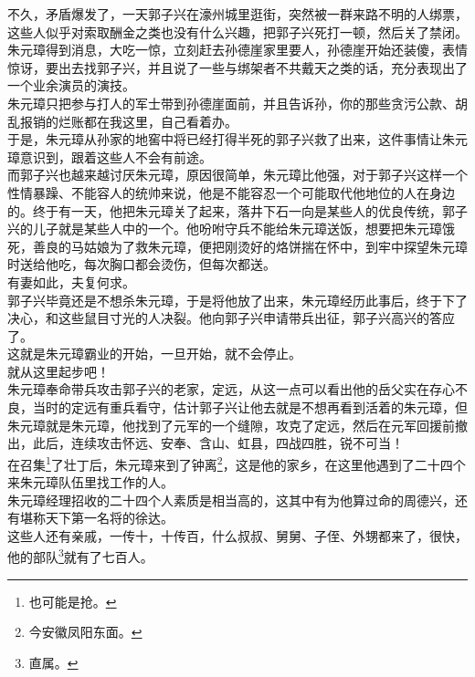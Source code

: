 \begin{multicols}{\theparacolNo}
不久，矛盾爆发了，一天郭子兴在濠州城里逛街，突然被一群来路不明的人绑票，这些人似乎对索取酬金之类也没有什么兴趣，把郭子兴死打一顿，然后关了禁闭。朱元璋得到消息，大吃一惊，立刻赶去孙德崖家里要人，孙德崖开始还装傻，表情惊讶，要出去找郭子兴，并且说了一些与绑架者不共戴天之类的话，充分表现出了一个业余演员的演技。\\

朱元璋只把参与打人的军士带到孙德崖面前，并且告诉孙，你的那些贪污公款、胡乱报销的烂账都在我这里，自己看着办。\\

于是，朱元璋从孙家的地窖中将已经打得半死的郭子兴救了出来，这件事情让朱元璋意识到，跟着这些人不会有前途。\\

而郭子兴也越来越讨厌朱元璋，原因很简单，朱元璋比他强，对于郭子兴这样一个性情暴躁、不能容人的统帅来说，他是不能容忍一个可能取代他地位的人在身边的。终于有一天，他把朱元璋关了起来，落井下石一向是某些人的优良传统，郭子兴的儿子就是某些人中的一个。他吩咐守兵不能给朱元璋送饭，想要把朱元璋饿死，善良的马姑娘为了救朱元璋，便把刚烫好的烙饼揣在怀中，到牢中探望朱元璋时送给他吃，每次胸口都会烫伤，但每次都送。\\

有妻如此，夫复何求。\\

郭子兴毕竟还是不想杀朱元璋，于是将他放了出来，朱元璋经历此事后，终于下了决心，和这些鼠目寸光的人决裂。他向郭子兴申请带兵出征，郭子兴高兴的答应了。\\

这就是朱元璋霸业的开始，一旦开始，就不会停止。\\

就从这里起步吧！\\

朱元璋奉命带兵攻击郭子兴的老家，定远，从这一点可以看出他的岳父实在存心不良，当时的定远有重兵看守，估计郭子兴让他去就是不想再看到活着的朱元璋，但朱元璋就是朱元璋，他找到了元军的一个缝隙，攻克了定远，然后在元军回援前撤出，此后，连续攻击怀远、安奉、含山、虹县，四战四胜，锐不可当！\\

在召集\footnote{也可能是抢。}了壮丁后，朱元璋来到了钟离\footnote{今安徽凤阳东面。}，这是他的家乡，在这里他遇到了二十四个来朱元璋队伍里找工作的人。\\

朱元璋经理招收的二十四个人素质是相当高的，这其中有为他算过命的周德兴，还有堪称天下第一名将的徐达。\\

这些人还有亲戚，一传十，十传百，什么叔叔、舅舅、子侄、外甥都来了，很快，他的部队\footnote{直属。}就有了七百人。\\


\end{multicols}
